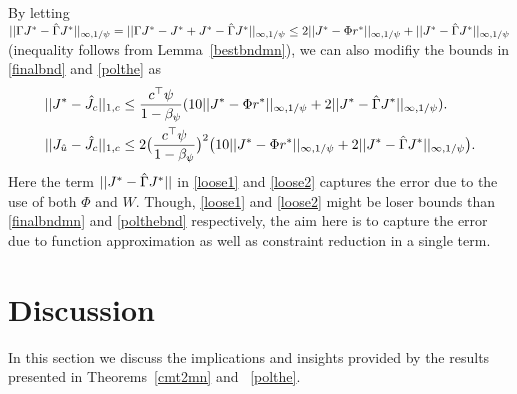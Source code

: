 \documentclass[12pt,draftcls,onecolumn]{IEEEtran}
\begin{document}
\begin{note}
By letting $||\Gamma J^*-\hat{\Gamma} J^*||_{\infty,1/\psi}=||\Gamma J^*-J^*+J^*-\hat{\Gamma} J^*||_{\infty,1/\psi}\leq 2||J^*-\Phi r^*||_{\infty,1/\psi}+||J^*-\hat{\Gamma} J^*||_{\infty,1/\psi}$ (inequality follows from Lemma~\ref{bestbndmn}), we can also modifiy the bounds in \eqref{finalbnd} and \eqref{polthe} as
\begin{align}
\label{loose1}||J^*-\hj||_{1,c}&\leq\frac{c^\top\psi}{1-\beta_\psi}(10 ||J^*-\Phi r^*||_{\mn}
+2||J^*-\hg J^*||_{\mn}).\\
\label{loose2}||J_{\hu}-\hj||_{1,c}&\leq 2\big(\frac{c^\top \psi}{1-\beta_{\psi}}\big)^2 \big(10 ||J^*-\Phi r^*||_{\mn}
+2||J^*-\hg J^*||_{\mn}\big).
\end{align}
Here the term $||J^*-\hat{\Gamma} J^*||$ in \eqref{loose1} and \eqref{loose2} captures the error due to the use of both $\Phi$ and $W$. Though, \eqref{loose1} and \eqref{loose2} might be loser bounds than \eqref{finalbndmn} and \eqref{polthebnd} respectively, the aim here is to capture the error due to function approximation as well as constraint reduction in a single term.
\end{note}


\section{Discussion}
In this section we discuss the implications and insights provided by the results presented in Theorems~\ref{cmt2mn} and ~\ref{polthe}.
\end{document}
